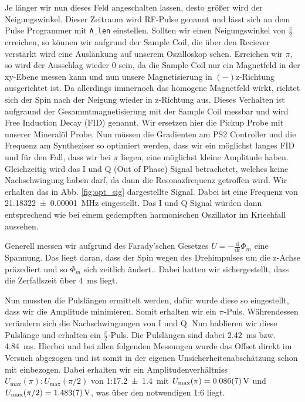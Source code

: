 \documentclass[10pt]{article}
\newenvironment{Figure}
  {\par\medskip\noindent\minipage{\linewidth}}
  {\endminipage\par\medskip}
\begin{document}
\begin{multicols}{2}
Je länger wir nun dieses Feld angeschalten lassen, desto größer wird der Neigungswinkel. Dieser Zeitraum wird RF-Pulse genannt und lässt sich an dem Pulse Programmer mit \texttt{A_len} einstellen. Sollten wir einen Neigungswinkel von $\frac{\pi}{2}$ erreichen, so können wir aufgrund der Sample Coil, die über den Reciever verstärkt wird eine Auslänkung auf unserem Oszilloskop sehen. Erreichen wir $\pi$, so wird der Ausschlag wieder 0 sein, da die Sample Coil nur ein Magnetfeld in der xy-Ebene messen kann und nun unsere Magnetisierung in $(-)$z-Richtung ausgerichtet ist. Da allerdings immernoch das homogene Magnetfeld wirkt, richtet sich der Spin nach der Neigung wieder in z-Richtung aus. Dieses Verhalten ist aufgraund der Gesammtmagnetisierung mit der Sample Coil messbar und wird Free Induction Decay (FID) genannt. Wir ersetzen hier die Pickup Probe mit unserer Mineralöl Probe. Nun müssen die Gradienten am PS2 Controller und die Frequenz am Syntheziser so optimiert werden, dass wir ein möglichst langes FID und für den Fall, dass wir bei $\pi$ liegen, eine möglichst kleine Amplitude haben. Gleichzeitig wird das I und Q (Out of Phase) Signal betrachetet, welches keine Nachschwingung haben darf, da dann die Resonazfrequenz getroffen wird. Wir erhalten das in Abb. \ref{fig:opt_sig} dargestellte Signal. Dabei ist eine Frequenz von \SI{21.18322+-0.00001}{\mega Hz} eingestellt. Das I und Q Signal würden dann entsprechend wie bei einem gedempften harmonischen Oszillator im Kriechfall aussehen.
  \begin{Figure}
    \centering\resizebox{\textwidth}{!}{}
    \label{fig:opt_sig}
  \end{Figure}
  Generell messen wir aufgrund des Farady'schen Gesetzes $U=-\frac{\text{d}}{\text{d}t}\Phi_m$ eine Spannung. Das liegt daran, dass der Spin wegen des Drehimpulses um die z-Achse präzediert und so $\Phi_m$ sich zeitlich ändert.. Dabei hatten wir sichergestellt, dass die Zerfallszeit über \SI{4}{\milli s} liegt.

  Nun mussten die Pulslängen ermittelt werden, dafür wurde diese so eingestellt, dass wir die Amplitude minimieren. Somit erhalten wir ein $\pi$-Puls. Währendessen verändern sich die Nachschwingungen von I und Q. Nun hablieren wir diese Pulslänge und erhalten ein $\frac{\pi}{2}$-Puls. Die Pulslängen sind dabei \SI{2.42}{\milli s} bzw. \SI{4.84}{\milli s}. Hierbei und bei allen folgenden Messungen wurde das Offset direkt im Versuch abgezogen und ist somit in der eigenen Unsicherheitenabschätzung schon mit einbezogen. Dabei erhalten wir ein Amplitudenverhältniss $U_{\text{max}}(\pi):U_{\text{max}}(\pi/2)$ von 1:\SI{17.2+-1.4} mit $U_{\text{max}}(\pi)=\SI{0.086+-0.007}{V}$ und $U_{\text{max}}(\pi/2)=\SI{1.483+-0.007}{V}$, was über den notwendigen 1:6 liegt.



\end{multicols}
\end{document}
